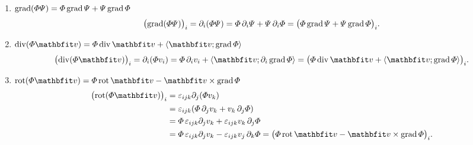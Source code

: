 \begin{example}
  \begin{enumerate}
    \item \underline{$\operatorname{grad}(\varPhi\varPsi)=\varPhi\operatorname{grad}\varPsi+\varPsi\operatorname{grad}\varPhi$}
          $$
            \bigl(\operatorname{grad}(\varPhi\varPsi)\bigr)_i
            = \partial_i(\varPhi\varPsi)
            = \varPhi\,\partial_i\varPsi+\varPsi\,\partial_i\varPhi
            = \bigl(\varPhi\operatorname{grad}\varPsi+\varPsi\operatorname{grad}\varPhi\bigr)_i
            \text.
          $$

    \item \underline{$\Div(\varPhi\rvec v)=\varPhi\Div\rvec v+\scalar{\rvec v}{\grad\varPhi}$}
          $$
            \bigl(\Div(\varPhi\rvec v)\bigr)_i
            = \partial_i(\varPhi v_i)
            = \varPhi\,\partial_iv_i+\scalar{\rvec v}{\partial_i\grad\varPhi}
            = \bigl(\varPhi\Div\rvec v+\scalar{\rvec v}{\grad\varPhi}\bigr)_i
            \text.
          $$

    \item \underline{$\rot(\varPhi\rvec v)=\varPhi\rot\rvec v-\rvec v\times\grad\varPhi$}
          $$
            \begin{aligned}
              \bigl(\rot(\varPhi\rvec v)\bigr)_i
               & = \varepsilon_{ijk}\partial_j(\varPhi v_k)
              \\
               & = \varepsilon_{ijk}(\varPhi\,\partial_jv_k+v_k\,\partial_j\varPhi)
              \\
               & = \varPhi\,\varepsilon_{ijk}\partial_jv_k+\varepsilon_{ijk}v_k\,\partial_j\varPhi
              \\
               & = \varPhi\,\varepsilon_{ijk}\partial_jv_k-\varepsilon_{ijk}v_j\,\partial_k\varPhi
              = \bigl(\varPhi\rot\rvec v-\rvec v\times\grad\varPhi\bigr)_i
              \text.
            \end{aligned}
          $$
  \end{enumerate}
\end{example}

\begin{example}
  \vspace{10.5cm}
\end{example}

